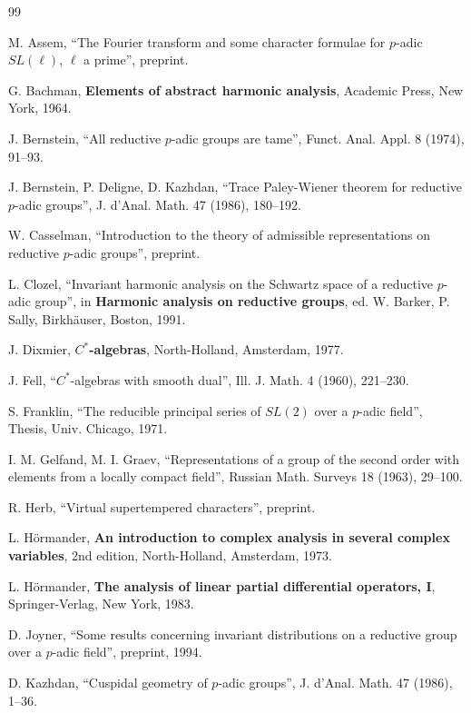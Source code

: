 \documentclass[11pt, a4paper]{article}
\begin{document}
\begin{thebibliography}{99}

  M. Assem, ``The Fourier transform and some character formulae for $p$-adic 
$SL(\ell )$, $\ell $ a prime'', preprint.

  G. Bachman, {\bf Elements of abstract harmonic analysis},
  Academic Press, New York, 1964.

  J. Bernstein, ``All reductive $p$-adic groups are tame'', Funct. Anal.
Appl. 8 (1974), 91--93.

  J. Bernstein, P. Deligne, D. Kazhdan, ``Trace Paley-Wiener theorem for
reductive $p$-adic groups'', J. d'Anal. Math. 47 (1986), 180--192.

  W. Casselman, ``Introduction to the theory of admissible
representations on reductive $p$-adic groups'', preprint.

  L. Clozel, ``Invariant harmonic analysis on the Schwartz space of a
reductive $p$-adic group'', in {\bf Harmonic analysis on reductive groups}, ed. W. Barker, P.
Sally, Birkh\"auser, Boston, 1991.

  J. Dixmier, {\bf $C^{*}$-algebras}, North-Holland, Amsterdam, 1977.

  J. Fell, ``$C^*$-algebras with smooth dual'', Ill. J. Math.
4 (1960), 221--230.

  S. Franklin, ``The reducible principal series of $SL(2)$ over a $p$-adic
field'', Thesis, Univ. Chicago, 1971.

  I. M. Gelfand, M. I. Graev, ``Representations of a group of the second
order with elements from a locally compact field'', Russian Math. Surveys
18 (1963), 29--100.

  R. Herb, ``Virtual supertempered characters'', preprint.

  L. H\"ormander, {\bf An introduction to complex analysis in several
    complex variables}, 2nd edition, North-Holland,
Amsterdam, 1973.

  L. H\"ormander, {\bf The analysis of linear partial differential operators, I},
  Springer-Verlag, New York, 1983.

  D. Joyner, ``Some results concerning invariant distributions on a
reductive group over a $p$-adic field'', preprint, 1994.

  D. Kazhdan, ``Cuspidal geometry of $p$-adic groups'', J. d'Anal. Math.
47 (1986), 1--36.


\end{thebibliography}
\end{document}
